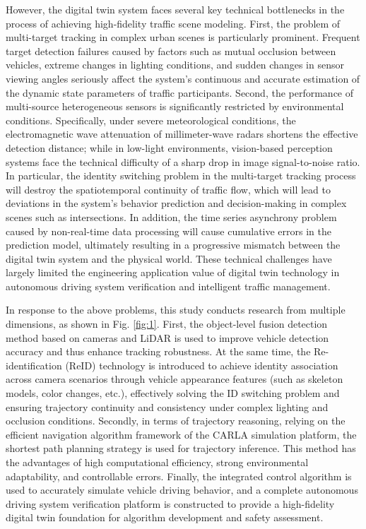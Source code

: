 \documentclass[journal,twoside,web]{ieeecolor}
\begin{document}
However, the digital twin system faces several key technical bottlenecks in the process of achieving high-fidelity traffic scene modeling.
First, the problem of multi-target tracking in complex urban scenes is particularly prominent. Frequent target detection failures caused by factors such as mutual occlusion between vehicles, extreme changes in lighting conditions, and sudden changes in sensor viewing angles seriously affect the system's continuous and accurate estimation of the dynamic state parameters of traffic participants\cite{Alpher23c}.
Second, the performance of multi-source heterogeneous sensors is significantly restricted by environmental conditions. Specifically, under severe meteorological conditions, the electromagnetic wave attenuation of millimeter-wave radars shortens the effective detection distance; while in low-light environments, vision-based perception systems face the technical difficulty of a sharp drop in image signal-to-noise ratio.
In particular, the identity switching problem in the multi-target tracking process will destroy the spatiotemporal continuity of traffic flow, which will lead to deviations in the system's behavior prediction and decision-making in complex scenes such as intersections.
In addition, the time series asynchrony problem caused by non-real-time data processing will cause cumulative errors in the prediction model, ultimately resulting in a progressive mismatch between the digital twin system and the physical world.
These technical challenges have largely limited the engineering application value of digital twin technology in autonomous driving system verification and intelligent traffic management.

In response to the above problems, this study conducts research from multiple dimensions, as shown in Fig. \ref{fig:1}. 
First, the object-level fusion detection method based on cameras and LiDAR is used to improve vehicle detection accuracy and thus enhance tracking robustness. 
At the same time, the Re-identification (ReID) technology is introduced to achieve identity association across camera scenarios through vehicle appearance features (such as skeleton models, color changes, etc.), effectively solving the ID switching problem and ensuring trajectory continuity and consistency under complex lighting and occlusion conditions\cite{Alpher23}. 
Secondly, in terms of trajectory reasoning, relying on the efficient navigation algorithm framework of the CARLA simulation platform, the shortest path planning strategy is used for trajectory inference. 
This method has the advantages of high computational efficiency, strong environmental adaptability, and controllable errors. 
Finally, the integrated control algorithm is used to accurately simulate vehicle driving behavior, and a complete autonomous driving system verification platform is constructed to provide a high-fidelity digital twin foundation for algorithm development and safety assessment\cite{Alpher24c}.
\end{document}
